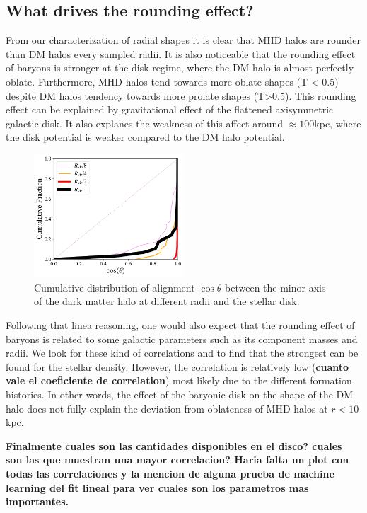 \documentclass[a4paper,fleqn,usenatbib]{mnras}
\begin{document}
\subsection{What drives the rounding effect?}

From our characterization of radial shapes it is clear that
MHD halos are rounder than DM halos every sampled radii. 
It is also noticeable that the rounding effect of baryons is stronger
at the disk regime, where the DM halo is almost perfectly oblate. 
Furthermore, MHD halos tend towards more oblate shapes (T < 0.5)
despite DM halos tendency towards more prolate shapes (T>0.5). 
This rounding effect can be explained by gravitational effect of the
flattened axisymmetric galactic disk. 
It also explanes the weakness of this affect around $\approx 100$kpc,
where the disk potential is weaker compared to the DM halo potential. 
  
\begin{figure}
\centering
\includegraphics[width=0.5\textwidth]{cumulative_alignment.pdf}
\caption{Cumulative distribution of alignment $\cos\theta$ between the
  minor axis of the dark matter halo at different radii and the
  stellar disk.} \label{fig:alignment_out}
\end{figure} 

Following that linea reasoning, one would also expect that the rounding
effect of baryons is related to some  galactic parameters such as its
component masses and radii. 
We look for these kind of correlations and to find that the strongest
can be found for the stellar density.
However, the correlation is relatively low ({\bf cuanto vale el
  coeficiente de correlation}) most likely due to the different
formation histories.
In other words, the effect of the baryonic disk on the shape of the DM halo
does not fully explain the deviation from oblateness of MHD halos at
$r<10$kpc. 

{\bf Finalmente cuales son las cantidades disponibles en el disco?
  cuales son las que muestran una mayor correlacion? Haria falta un
  plot con todas las correlaciones y la mencion de alguna prueba de
  machine learning del fit lineal para ver cuales son los parametros
  mas importantes.}
  
\end{document}
